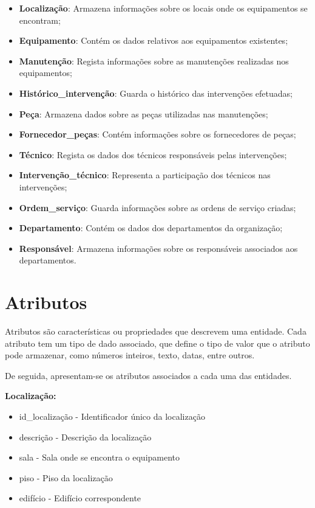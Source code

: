 \begin{itemize}
    \item \textbf{Localização}: Armazena informações sobre os locais onde os equipamentos se encontram;
    \item \textbf{Equipamento}: Contém os dados relativos aos equipamentos existentes;
    \item \textbf{Manutenção}: Regista informações sobre as manutenções realizadas nos equipamentos;
    \item \textbf{Histórico\_intervenção}: Guarda o histórico das intervenções efetuadas;
    \item \textbf{Peça}: Armazena dados sobre as peças utilizadas nas manutenções;
    \item \textbf{Fornecedor\_peças}: Contém informações sobre os fornecedores de peças;
    \item \textbf{Técnico}: Regista os dados dos técnicos responsáveis pelas intervenções;
    \item \textbf{Intervenção\_técnico}: Representa a participação dos técnicos nas intervenções;
    \item \textbf{Ordem\_serviço}: Guarda informações sobre as ordens de serviço criadas;
    \item \textbf{Departamento}: Contém os dados dos departamentos da organização;
    \item \textbf{Responsável}: Armazena informações sobre os responsáveis associados aos departamentos.
\end{itemize}


\section{ Atributos}
Atributos são características ou propriedades que descrevem uma entidade. Cada atributo tem
um tipo de dado associado, que define o tipo de valor que o atributo pode armazenar, como números
inteiros, texto, datas, entre outros.

De seguida, apresentam-se os atributos associados a cada uma das entidades.

\textbf{Localização:}
\begin{itemize}
    \item id\_localização - Identificador único da localização
    \item descrição - Descrição da localização
    \item sala - Sala onde se encontra o equipamento
    \item piso - Piso da localização
    \item edifício - Edifício correspondente
\end{itemize}

